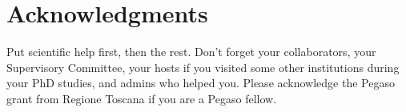 \section*{Acknowledgments}
Put scientific help first, then the rest. Don't forget your
collaborators, your Supervisory Committee, your hosts if you visited
some other institutions during your PhD studies, and admins who helped
you. Please acknowledge the Pegaso grant from Regione Toscana if you
are a Pegaso fellow.
